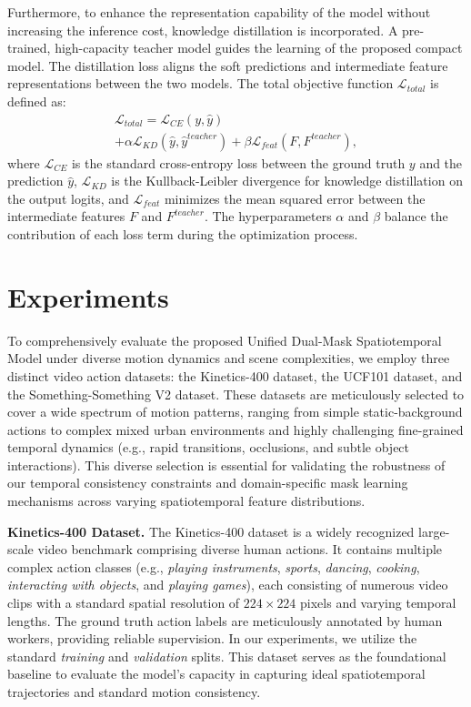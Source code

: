 \documentclass[lettersize,journal]{IEEEtran}
\begin{document}
Furthermore, to enhance the representation capability of the model without increasing the inference cost, knowledge distillation is incorporated. A pre-trained, high-capacity teacher model guides the learning of the proposed compact model. The distillation loss aligns the soft predictions and intermediate feature representations between the two models. The total objective function $\mathcal{L}_{total}$ is defined as:
\begin{multline}

\mathcal{L}_{total} = \mathcal{L}_{CE}(y, \hat{y}) \\
+ \alpha \mathcal{L}_{KD}(\hat{y}, \hat{y}^{teacher}) + \beta \mathcal{L}_{feat}(F, F^{teacher}),
\end{multline}
where $\mathcal{L}_{CE}$ is the standard cross-entropy loss between the ground truth $y$ and the prediction $\hat{y}$, $\mathcal{L}_{KD}$ is the Kullback-Leibler divergence for knowledge distillation on the output logits, and $\mathcal{L}_{feat}$ minimizes the mean squared error between the intermediate features $F$ and $F^{teacher}$. The hyperparameters $\alpha$ and $\beta$ balance the contribution of each loss term during the optimization process.

\section{Experiments}

To comprehensively evaluate the proposed Unified Dual-Mask Spatiotemporal Model under diverse motion dynamics and scene complexities, we employ three distinct video action datasets: the Kinetics-400 dataset, the UCF101 dataset, and the Something-Something V2 dataset. These datasets are meticulously selected to cover a wide spectrum of motion patterns, ranging from simple static-background actions to complex mixed urban environments and highly challenging fine-grained temporal dynamics (e.g., rapid transitions, occlusions, and subtle object interactions). This diverse selection is essential for validating the robustness of our temporal consistency constraints and domain-specific mask learning mechanisms across varying spatiotemporal feature distributions.

\textbf{Kinetics-400 Dataset.} The Kinetics-400 dataset is a widely recognized large-scale video benchmark comprising diverse human actions. It contains multiple complex action classes (e.g., \textit{playing instruments}, \textit{sports}, \textit{dancing}, \textit{cooking}, \textit{interacting with objects}, and \textit{playing games}), each consisting of numerous video clips with a standard spatial resolution of $224 \times 224$ pixels and varying temporal lengths. The ground truth action labels are meticulously annotated by human workers, providing reliable supervision. In our experiments, we utilize the standard \textit{training} and \textit{validation} splits. This dataset serves as the foundational baseline to evaluate the model's capacity in capturing ideal spatiotemporal trajectories and standard motion consistency.
\end{document}
